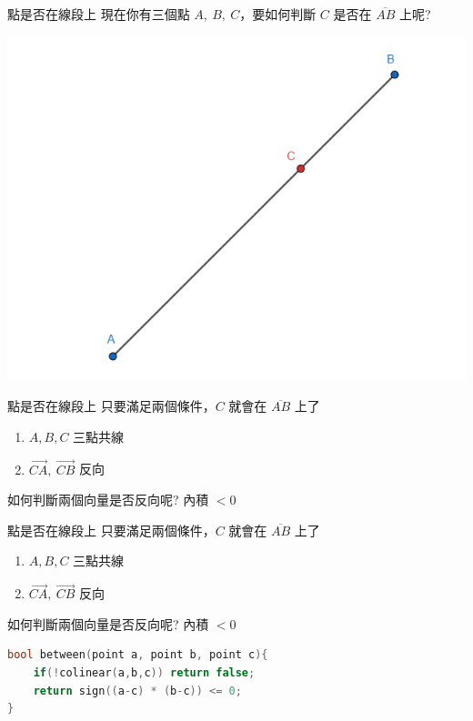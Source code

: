 \documentclass[aspectratio=169]{beamer}
\begin{document}
\begin{frame}[fragile]{點是否在線段上}
    現在你有三個點 $A, \ B, \ C$，要如何判斷 $C$ 是否在 $\overline{AB}$ 上呢?
    \begin{center}
        \includegraphics[scale=0.5]{images/between.png}
    \end{center}
\end{frame}

\begin{frame}[fragile]{點是否在線段上}
    只要滿足兩個條件，$C$ 就會在 $\overline{AB}$ 上了
    \begin{enumerate}
        \item $A,B,C$ 三點共線
        \item $\overrightarrow{CA}, \ \overrightarrow{CB}$ 反向
    \end{enumerate} \pause
    如何判斷兩個向量是否反向呢? \pause 內積 $< 0$
\end{frame}

\begin{frame}[fragile]{點是否在線段上}
    只要滿足兩個條件，$C$ 就會在 $\overline{AB}$ 上了
    \begin{enumerate}
        \item $A,B,C$ 三點共線
        \item $\overrightarrow{CA}, \ \overrightarrow{CB}$ 反向
    \end{enumerate}
    如何判斷兩個向量是否反向呢? 內積 $< 0$
    
    \begin{lstlisting}[language=C++,basicstyle=\ttfamily\small]
bool between(point a, point b, point c){
    if(!colinear(a,b,c)) return false;
    return sign((a-c) * (b-c)) <= 0; 
}
    \end{lstlisting}
\end{frame}
\end{document}
